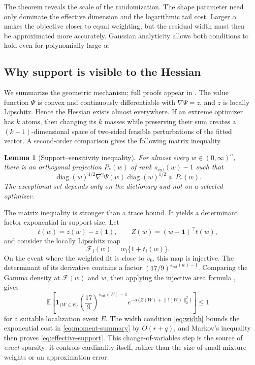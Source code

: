 \documentclass[11pt]{article}
\newtheorem{lemma}[theorem]{Lemma}
\theoremstyle{definition}
\theoremstyle{remark}
\DeclareMathOperator{\diag}{diag}
\newcommand{\EE}{\mathbb E}
\newcommand{\one}{\bm 1}
\newcommand{\norm}[1]{\lVert #1\rVert}
\begin{document}
The theorem reveals the scale of the randomization.  The shape parameter need
only dominate the effective dimension and the logarithmic tail cost.  Larger
$\alpha$ makes the objective closer to equal weighting, but the residual
width must then be approximated more accurately.  Gaussian analyticity allows
both conditions to hold even for polynomially large $\alpha$.

\subsection{Why support is visible to the Hessian}

We summarize the geometric mechanism; full proofs appear in
.  The value function $\Psi$ is convex and continuously
differentiable with $\nabla\Psi=z$, and $z$ is locally Lipschitz.  Hence the
Hessian exists almost everywhere.  If an extreme optimizer has $k$ atoms,
then changing its $k$ masses while preserving their sum creates a
$(k-1)$-dimensional space of two-sided feasible perturbations of the fitted
vector.  A second-order comparison gives the following matrix inequality.

\begin{lemma}[Support--sensitivity inequality]
\label{lem:hessian-summary}
For almost every $w\in(0,\infty)^n$, there is an orthogonal projection
$P_*(w)$ of rank $s_{\mathrm{ext}}(w)-1$ such that
\begin{equation}\label{eq:hessian-summary}
 \diag(w)^{1/2}\nabla^2\Psi(w)\diag(w)^{1/2}\succeq P_*(w).
\end{equation}
The exceptional set depends only on the dictionary and not on a selected
optimizer.
\end{lemma}

The matrix inequality is stronger than a trace bound.  It yields a determinant
factor exponential in support size.  Let
\[
 t(w)=z(w)-z(\one),
 \qquad Z(w)=(w-\one)^\top t(w),
\]
and consider the locally Lipschitz map
\begin{equation}\label{eq:change-map}
 \mathcal F_i(w)=w_i\{1+t_i(w)\}.
\end{equation}
On the event where the weighted fit is close to $v_0$, this map is injective.
The determinant of its derivative contains a factor
$(17/9)^{s_{\mathrm{ext}}(w)-1}$.  Comparing the Gamma density at
$\mathcal F(w)$ and $w$, then applying the injective area formula
\citep{evansgariepy2015}, gives
\begin{equation}\label{eq:moment-summary}
 \EE\left[\bm 1_{\{W\in E\}}
 \left(\frac{17}{9}\right)^{s_{\mathrm{ext}}(W)-1}
 e^{-\alpha\{Z(W)+\norm{t(W)}_2^2\}}\right]\le1
\end{equation}
for a suitable localization event $E$.  The width condition
\eqref{eq:width} bounds the exponential cost in \eqref{eq:moment-summary} by
$O(r+q)$, and Markov's inequality then proves
\eqref{eq:effective-support}.  This change-of-variables step is the source of
\emph{exact} sparsity: it controls cardinality itself, rather than the size of
small mixture weights or an approximation error.
\end{document}
